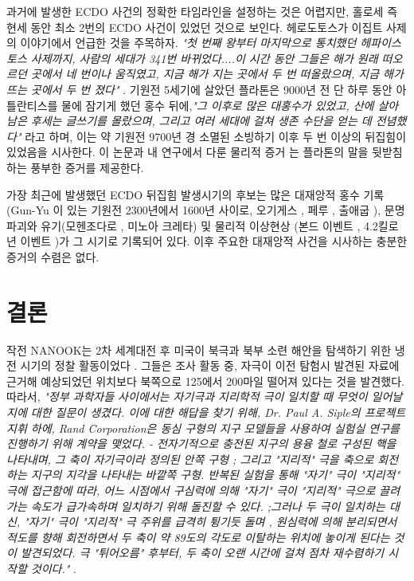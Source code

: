 \documentclass[10pt,twocolumn,letterpaper]{article}
\begin{document}
과거에 발생한  ECDO 사건의 정확한 타임라인을 설정하는 것은 어렵지만, 홀로세 즉 현세 동안 최소 2번의 ECDO 사건이 있었던 것으로 보인다. 헤로도토스가 이집트 사제의 이야기에서 언급한 것을 주목하자. \textit{"첫 번째 왕부터 마지막으로 통치했던 헤파이스토스 사제까지, 사람의 세대가 341번 바뀌었다....이 시간 동안 그들은 해가 원래 떠오르던 곳에서 네 번이나 움직였고, 지금 해가 지는 곳에서 두 번 떠올랐으며, 지금 해가 뜨는 곳에서 두 번 졌다"} \cite{32}. 기원전 5세기에 살았던 플라톤은 9000년 전 단 하루 동안 아틀란티스를 물에 잠기게 했던 홍수 뒤에,\textit{"그 이후로 많은 대홍수가 있었고, 산에 살아남은 후세는 글쓰기를 몰랐으며, 그리고  여러 세대에 걸쳐 생존 수단을 얻는 데 전념했다"} \cite{112}라고 하며, 이는 약 기원전 9700년 경 소멸된 소빙하기 이후 두 번 이상의 뒤집힘이 있었음을 시사한다. 이 논문과 내 연구에서 다룬 물리적 증거 \cite{2}는 플라톤의 말을 뒷받침하는 풍부한 증거를 제공한다.

가장 최근에 발생했던 ECDO 뒤집힘 발생시기의 후보는  많은 대재앙적 홍수 기록(Gun-Yu \cite{113,114,115}이 있는 기원전 2300년에서 1600년 사이로, 오기게스 \cite{116,117}, 페루 \cite{118,119}, 출애굽 \cite{120}), 문명 파괴와 유기(모헨조다로 \cite{121}, 미노아 크레타\cite{100,101}) 및 물리적 이상현상 (본드 이벤트 \cite{122}, 4.2킬로년 이벤트 \cite{90})가 그 시기로 기록되어 있다. 이후 주요한 대재앙적 사건을 시사하는 충분한 증거의 수렴은 없다.

\section{결론}
작전 NANOOK는 2차 세계대전 후 미국이 북극과 북부 소련 해안을 탐색하기 위한 냉전 시기의 정찰 활동이었다 \cite{137}. 그들은 조사 활동 중, 자극이 이전 탐험시 발견된 자료에 근거해 예상되었던 위치보다 북쪽으로 125에서 200마일 떨어져 있다는 것을 발견했다. 따라서, \textit{"정부 과학자들 사이에서는 자기극과  지리학적 극이 일치할 때 무엇이 일어날지에 대한 질문이 생겼다. 이에 대한 해답을 찾기 위해, Dr. Paul A. Siple의 프로젝트 지휘 하에, Rand Corporation은 동심 구형의 지구 모델들을 사용하여  실험실 연구를 진행하기 위해 계약을 맺었다. - 전자기적으로 충전된 지구의 용융 철로 구성된 핵을 나타내며, 그 축이 자기극이라 정의된 안쪽 구형 ; 그리고 "지리적" 극을 축으로 회전하는 지구의 지각을 나타내는 바깥쪽 구형. 반복된 실험을 통해 "자기" 극이 "지리적" 극에 접근함에 따라, 어느 시점에서 구심력에 의해  "자기" 극이 "지리적" 극으로 끌려가는 속도가 급가속하며 일치하기 위해 돌진할 수 있다. ;그러나 두 극이 일치하는 대신, "자기" 극이 "지리적" 극 주위를 급격히 튕기듯 돌며 , 원심력에 의해 분리되면서 적도를 향해 회전하면서 두 축이 약 89도의 각도로 이탈하는 위치에 놓이게 된다는 것이 발견되었다. 극 "튀어오름" 후부터, 두 축이 오랜 시간에 걸쳐 점차 재수렴하기 시작할 것이다."} \cite{138,139}.
\end{document}
